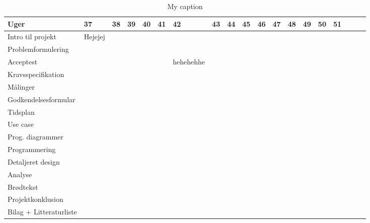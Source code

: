 \documentclass[12pt, letterpaper]{article}
\begin{document}
\begin{table}[]
\centering
\caption{My caption}
\label{my-label}
\begin{tabular}{|l|l|l|l|l|l|l|l|l|l|l|l|l|l|l|l|l|l|l|}
\hline
Uger                    & 37 & 38 & 39 & 40 & 41 & 42 & 43 & 44 & 45 & 46 & 47 & 48 & 49 & 50 & 51 &  &  &  \\ \hline
Intro til projekt       &  Hejejej  &    &    &    &    &    &    &    &    &    &    &    &    &    &    &  &  &  \\ \hline
Problemformulering      &    &    &    &    &    &    &    &    &    &    &    &    &    &    &    &  &  &  \\ \hline
Acceptest               &    &    &    &    &    &    hehehehhe    &    &    &    &    &    &    &    &    &  &  &  \\ \hline
Kravsspecifikation      &    &    &    &    &    &    &    &    &    &    &    &    &    &    &    &  &  &  \\ \hline
Målinger                &    &    &    &    &    &    &    &    &    &    &    &    &    &    &    &  &  &  \\ \hline
Godkendelsesformular    &    &    &    &    &    &    &    &    &    &    &    &    &    &    &    &  &  &  \\ \hline
Tidsplan                &    &    &    &    &    &    &    &    &    &    &    &    &    &    &    &  &  &  \\ \hline
Use case                &    &    &    &    &    &    &    &    &    &    &    &    &    &    &    &  &  &  \\ \hline
Prog. diagrammer        &    &    &    &    &    &    &    &    &    &    &    &    &    &    &    &  &  &  \\ \hline
Programmering           &    &    &    &    &    &    &    &    &    &    &    &    &    &    &    &  &  &  \\ \hline
Detaljeret design       &    &    &    &    &    &    &    &    &    &    &    &    &    &    &    &  &  &  \\ \hline
Analyse                 &    &    &    &    &    &    &    &    &    &    &    &    &    &    &    &  &  &  \\ \hline
Brødtekst               &    &    &    &    &    &    &    &    &    &    &    &    &    &    &    &  &  &  \\ \hline
Projektkonklusion       &    &    &    &    &    &    &    &    &    &    &    &    &    &    &    &  &  &  \\ \hline
Bilag + Litteraturliste &    &    &    &    &    &    &    &    &    &    &    &    &    &    &    &  &  &  \\ \hline

\end{tabular}
\end{table}
\end{document}
